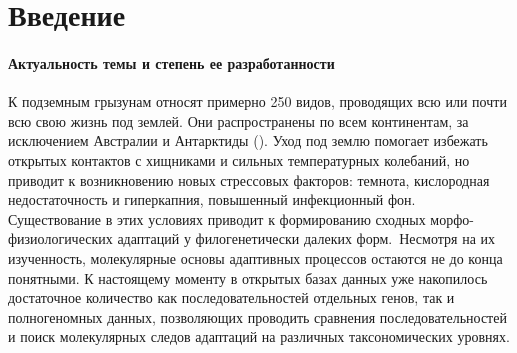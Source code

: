 \chapter*{Введение}							%

\subsubsection*{Актуальность темы и степень ее разработанности}
%
%
%

К подземным грызунам относят примерно 250 видов, проводящих всю или почти всю свою жизнь под землей. Они распространены по всем континентам, за исключением Австралии и Антарктиды (\cite{Fang2015}). Уход под землю помогает избежать открытых контактов с хищниками и сильных температурных колебаний, но приводит к возникновению новых стрессовых факторов: темнота, кислородная недостаточность и гиперкапния, повышенный инфекционный фон. Существование в этих условиях приводит к формированию сходных морфо-физиологических адаптаций у филогенетически далеких форм. Несмотря на их изученность, молекулярные основы адаптивных процессов остаются не до конца понятными. К настоящему моменту в открытых базах данных уже накопилось достаточное количество как последовательностей отдельных генов, так и полногеномных данных, позволяющих проводить сравнения последовательностей и поиск молекулярных следов адаптаций на различных таксономических уровнях.

